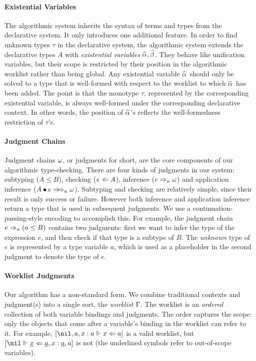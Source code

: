 \paragraph{Existential Variables} 
The algorithmic system inherits the syntax of terms and types from 
the declarative system. It only introduces one additional feature.
In order to find unknown types $\tau$ in the declarative system, the
algorithmic system extends the declarative types $A$ with \emph{existential variables} $\al, \bt$.
They behave like unification variables,
but their scope is restricted by their position in the
algorithmic worklist rather than being global.
Any existential variable $\al$ should only be solved to
a type that is well-formed with respect to the worklist to which $\al$ has been added.
The point is that the monotype $\tau$, represented by the corresponding existential variable,
is always well-formed under the corresponding declarative context.
In other words, the position of $\al$'s reflects the well-formedness restriction of $\tau$'s.


\paragraph{Judgment Chains} 
Judgment chains $\omega$, or judgments for short, are the core components of our algorithmic
type-checking. There are four kinds
of judgments in our system: subtyping ($A \le B$), checking ($e\Leftarrow
A$), inference ($e\Rightarrow_{a} \omega$) and
application inference ($\appInfAlg{A}{e}$).  Subtyping and checking are relatively simple,
since their result is only success or failure. However both inference and
application inference return a type that is used in subsequent judgments. We use a
continuation-passing-style encoding to accomplish this. For example, the judgment
chain $e \Rightarrow_a (a \le B)$ contains two judgments: first we want to
infer the type of the expression $e$, and then check if that type is a
subtype of $B$. The \emph{unknown} type of $e$ is represented by a
type variable $a$, which is used as a placeholder in the second judgment to denote the 
type of $e$.

\paragraph{Worklist Judgments} Our algorithm has a non-standard form.
We combine traditional contexts and judgment(s) into a single sort, the \emph{worklist} $\Gamma$.
The worklist is an \emph{ordered} collection of both variable bindings and judgments. The order captures the scope:
only the objects that come after a variable's binding in the worklist can refer to it.
For example, $[\nil, a, x:a \Vdash x \Lto a]$ is a valid worklist,
but $[\nil \Vdash \underline{x} \Lto \underline{a}, x:\underline{a}, a]$ is not
(the underlined symbols refer to out-of-scope variables).

